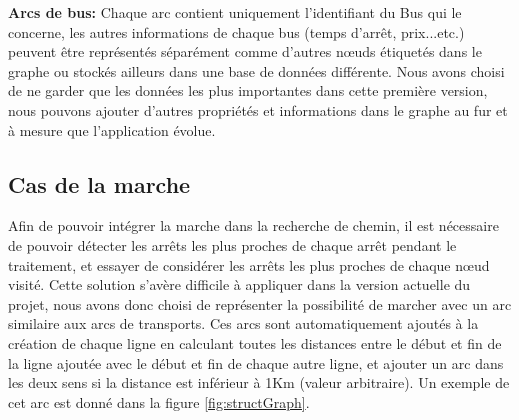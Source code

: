 \textbf{Arcs de bus: } Chaque arc contient uniquement l'identifiant du Bus qui le concerne, les autres informations de chaque bus (temps d'arrêt, prix...etc.) peuvent être représentés séparément comme d'autres nœuds étiquetés dans le graphe ou stockés ailleurs dans une base de données différente. \newline
Nous avons choisi de ne garder que les données les plus importantes dans cette première version, nous pouvons ajouter d'autres propriétés et informations dans le graphe au fur et à mesure que l'application évolue.

%

\subsection{Cas de la marche}
Afin de pouvoir intégrer la marche dans la recherche de chemin, il est nécessaire de pouvoir détecter les arrêts les plus proches de chaque arrêt pendant le traitement, et essayer de considérer les arrêts les plus proches de chaque nœud visité.\newline 
Cette solution s'avère difficile à appliquer dans la version actuelle du projet, nous avons donc choisi de représenter la possibilité de marcher avec un arc similaire aux arcs de transports.\newline
Ces arcs sont automatiquement ajoutés à la création de chaque ligne en calculant toutes les distances entre le début et fin de la ligne ajoutée avec le début et fin de chaque autre ligne, et ajouter un arc dans les deux sens si la distance est inférieur à 1Km (valeur arbitraire).
Un exemple de cet arc est donné dans la figure \ref{fig:structGraph}.

